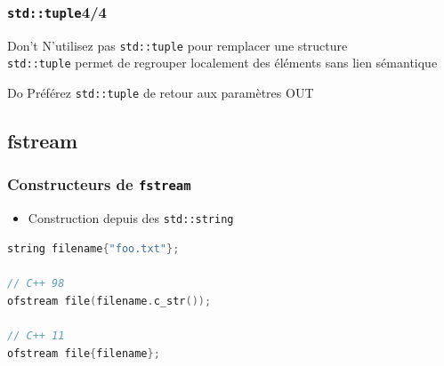 \documentclass[C++.tex]{subfiles}
\begin{document}
\begin{frame}[fragile]
	\frametitle{\lstinline|std::tuple|\titlehfill{}4/4}
	\begin{alertblock}{Don't}
		N'utilisez pas \lstinline|std::tuple| pour remplacer une structure\\
		\lstinline|std::tuple| permet de regrouper localement des éléments sans lien sémantique
	\end{alertblock}

	\begin{exampleblock}{Do}
		Préférez \lstinline|std::tuple| de retour aux paramètres OUT
	\end{exampleblock}
\end{frame}

\subsection*{fstream}
\begin{frame}[fragile]
	\frametitle{Constructeurs de \lstinline|fstream|}
	\begin{itemize}
		\item Construction depuis des \lstinline|std::string|
	\end{itemize}

	\begin{lstlisting}[language=C++]
string filename{"foo.txt"};

// C++ 98
ofstream file(filename.c_str());

// C++ 11
ofstream file{filename};\end{lstlisting}
\end{frame}
\end{document}
